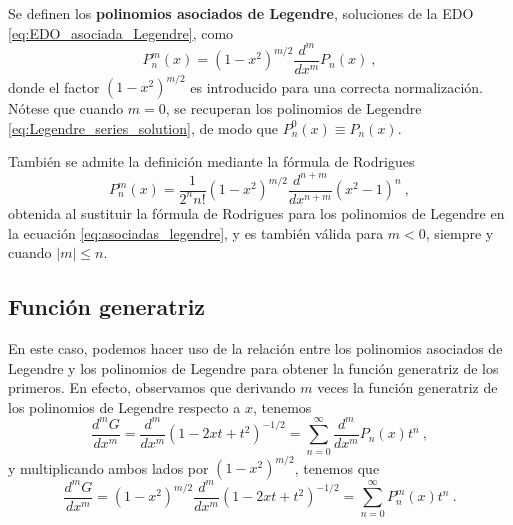 \begin{defi}
    Se definen los \textbf{polinomios asociados de Legendre}, soluciones de la EDO \eqref{eq:EDO_asociada_Legendre}, como
    \begin{equation} \label{eq:asociadas_legendre}
        P_n^m(x) = (1-x^2)^{m/2} \frac{d^m}{dx^m}P_n(x) \ ,
    \end{equation}
    donde el factor $(1-x^2)^{m/2}$ es introducido para una correcta normalización. Nótese que cuando $m=0$, se recuperan los polinomios de Legendre \eqref{eq:Legendre_series_solution}, de modo que $P_n^0(x) \equiv P_n(x)$. 

    También se admite la definición mediante la fórmula de Rodrigues
    \begin{equation} \label{eq:rodrigues-asociados}
        P_n^m(x) = \frac{1}{2^n n!}(1-x^2)^{m/2} \frac{d^{n+m}}{dx^{n+m}}(x^2-1)^n \ ,
    \end{equation}
    obtenida al sustituir la fórmula de Rodrigues para los polinomios de Legendre en la ecuación \eqref{eq:asociadas_legendre}, y es también válida para $m<0$, siempre y cuando $|m|\leq n$.
\end{defi}



\subsection{Función generatriz}

En este caso, podemos hacer uso de la relación entre los polinomios asociados de Legendre y los polinomios de Legendre para obtener la función generatriz de los primeros. En efecto, observamos que derivando $m$ veces la función generatriz de los polinomios de Legendre respecto a $x$, tenemos
\begin{equation}
    \frac{d^m G}{dx^m} = \frac{d^m}{dx^m}(1-2xt+t^2)^{-1/2} = \sum_{n=0}^\infty \frac{d^m}{dx^m}P_n(x) t^n \ ,
\end{equation}
y multiplicando ambos lados por $(1-x^2)^{m/2}$, tenemos que
\begin{equation}
    \frac{d^m G}{dx^m} = (1-x^2)^{m/2} \frac{d^m}{dx^m}(1-2xt+t^2)^{-1/2} = \sum_{n=0}^\infty P^m_n(x) t^n \ .
\end{equation}

